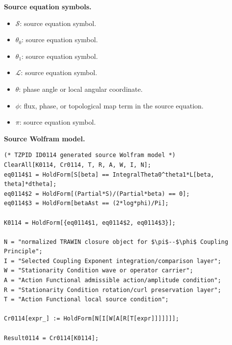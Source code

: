 \begin{minipage}[t]{0.49\linewidth}
\begingroup
\small
\raggedright
\textbf{Source equation symbols.}\par
\begin{itemize}[leftmargin=1.35em,itemsep=1pt,topsep=1pt,parsep=0pt]
    \item $\mathcal{S}$: source equation symbol.
    \item $\theta_0$: source equation symbol.
    \item $\theta_1$: source equation symbol.
    \item $\mathcal{L}$: source equation symbol.
    \item $\theta$: phase angle or local angular coordinate.
    \item $\phi$: flux, phase, or topological map term in the source equation.
    \item $\pi$: source equation symbol.
\end{itemize}
\endgroup
\end{minipage}\hfill
\begin{minipage}[t]{0.47\linewidth}
\begingroup
\scriptsize
\raggedright
\textbf{Source Wolfram model.}\par
\begin{Verbatim}[fontsize=\tiny,breaklines=true,breakanywhere=true]
(* TZPID ID0114 generated source Wolfram model *)
ClearAll[K0114, Cr0114, T, R, A, W, I, N];
eq0114$1 = HoldForm[S[beta] == IntegralTheta0^theta1*L[beta, theta]*dtheta];
eq0114$2 = HoldForm[(Partial*S)/(Partial*beta) == 0];
eq0114$3 = HoldForm[betaAst == (2*log*phi)/Pi];

K0114 = HoldForm[{eq0114$1, eq0114$2, eq0114$3}];

N = "normalized TRAWIN closure object for $\pi$--$\phi$ Coupling Principle";
I = "Selected Coupling Exponent integration/comparison layer";
W = "Stationarity Condition wave or operator carrier";
A = "Action Functional admissible action/amplitude condition";
R = "Stationarity Condition rotation/curl preservation layer";
T = "Action Functional local source condition";

Cr0114[expr_] := HoldForm[N[I[W[A[R[T[expr]]]]]]];

Result0114 = Cr0114[K0114];
\end{Verbatim}
\endgroup
\end{minipage}

